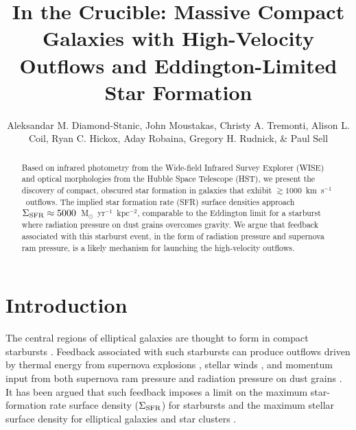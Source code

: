 \documentclass[apj]{emulateapj}
\newcommand{\kms}{km~s$^{-1}$}
\newcommand{\msun}{M$_{\odot}$}
\newcommand{\sigmasfr}{\Sigma_{\textnormal{\scriptsize{SFR}}}}
\begin{document}

\title{In the Crucible: Massive Compact Galaxies with High-Velocity
  Outflows and Eddington-Limited Star Formation}

\author{Aleksandar M. Diamond-Stanic, John
  Moustakas, Christy A. Tremonti,
  Alison L. Coil, Ryan C. Hickox, Aday
  Robaina, Gregory H. Rudnick, \& Paul
  Sell }




\begin{abstract}

Based on infrared photometry from the Wide-field Infrared Survey
Explorer (WISE) and optical morphologies from the Hubble Space
Telescope (HST), we present the discovery of compact, obscured star
formation in galaxies that exhibit $\gtrsim1000$~\kms\ outflows.  The
implied star formation rate (SFR) surface densities approach
$\sigmasfr\approx5000$~\msun~yr$^{-1}$~kpc$^{-2}$, comparable to the
Eddington limit for a starburst where radiation pressure on dust
grains overcomes gravity.  We argue that feedback associated with this
starburst event, in the form of radiation pressure and supernova ram
pressure, is a likely mechanism for launching the high-velocity
outflows.

\end{abstract}


\section{Introduction}

The central regions of elliptical galaxies are thought to form in
compact starbursts \citep[e.g.,][]{kor09,hop09}.  Feedback associated
with such starbursts can produce outflows driven by thermal energy
from supernova explosions \citep[e.g.,][]{che85}, stellar winds
\citep[e.g.,][]{lei92}, and momentum input from both supernova ram
pressure and radiation pressure on dust grains \citep[e.g.,][]{mur05}.
It has been argued that such feedback imposes a limit on the maximum
star-formation rate surface density ($\sigmasfr$) for starbursts
\citep[e.g.,][]{leh96,meu97,mur05,tho05} and the maximum stellar
surface density for elliptical galaxies and star clusters
\citep[e.g.,][]{hop10}.
\end{document}
